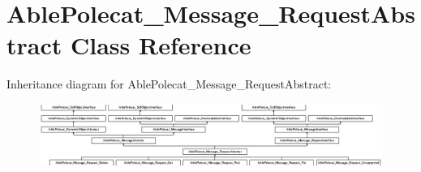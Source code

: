 \hypertarget{class_able_polecat___message___request_abstract}{}\section{Able\+Polecat\+\_\+\+Message\+\_\+\+Request\+Abstract Class Reference}
\label{class_able_polecat___message___request_abstract}
Inheritance diagram for Able\+Polecat\+\_\+\+Message\+\_\+\+Request\+Abstract\+:\begin{figure}[H]
\begin{center}
\leavevmode
\includegraphics[height=2.036364cm]{class_able_polecat___message___request_abstract}
\end{center}
\end{figure}
